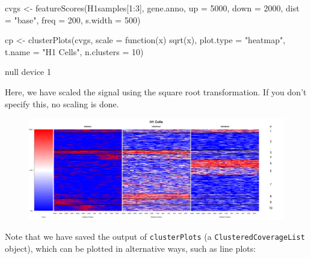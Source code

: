 \begin{Schunk}
\begin{Sinput}
 cvgs <- featureScores(H1samples[1:3], gene.anno, up = 5000, down = 2000, dist = "base",
                       freq = 200, s.width = 500)
\end{Sinput}
\end{Schunk}


\begin{Schunk}
\begin{Sinput}
 cp <- clusterPlots(cvgs, scale = function(x) sqrt(x), plot.type = "heatmap",
              t.name = "H1 Cells", n.clusters = 10)
\end{Sinput}
\end{Schunk}

\begin{Schunk}
\begin{Soutput}
null device 
          1 
\end{Soutput}
\end{Schunk}

Here, we have scaled the signal using the square root transformation.  If you don't specify this, no scaling is done.

\begin{figure}[!h]
    \begin{center}
        \includegraphics[height=0.48\textheight, width = 1.1\textwidth]{clusterPlot.png}
    \end{center}
\end{figure}

Note that we have saved the output of \texttt{clusterPlots} (a \texttt{ClusteredCoverageList} object), which can be plotted in alternative ways, such as line plots: 

